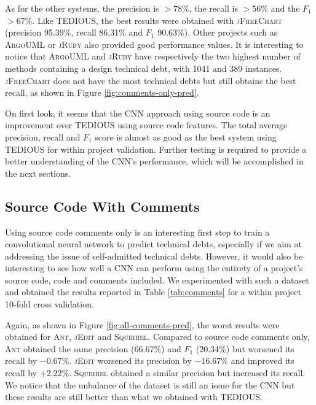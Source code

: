 As for the other systems, the precision is $> 78\%$, the recall is $> 56\%$ and the $F_1$ $> 67\%$. Like TEDIOUS, the best results were obtained with \textsc{jFreeChart} (precision 95.39\%, recall 86.31\% and $F_1$ 90.63\%). Other projects such as \textsc{ArgoUML} or \textsc{jRuby} also provided good performance values. It is interesting to notice that \textsc{ArgoUML} and \textsc{jRuby} have respectively the two highest number of methods containing a design technical debt, with 1041 and 389 instances. \textsc{jFreeChart} does not have the most technical debts but still obtains the best recall, as shown in Figure \ref{fig:comments-only-pred}.

On first look, it seems that the CNN approach using source code is an improvement over TEDIOUS using source code features. The total average precision, recall and $F_1$ score is almost as good as the best system using TEDIOUS for within project validation. Further testing is required to provide a better understanding of the CNN's performance, which will be accomplished in the next sections.



\subsection{Source Code With Comments}


Using source code comments only is an interesting first step to train a convolutional neural network to predict technical debts, especially if we aim at addressing the issue of self-admitted technical debts. However, it would also be interesting to see how well a CNN can perform using the entirety of a project's source code, code and comments included. We experimented with such a dataset and obtained the results reported in Table \ref{tab:comments} for a within project 10-fold cross validation.

Again, as shown in Figure \ref{fig:all-comments-pred}, the worst results were obtained for \textsc{Ant}, \textsc{jEdit} and \textsc{Squirrel}. Compared to source code comments only, \textsc{Ant} obtained the same precision (66.67\%) and $F_1$ (20.34\%) but worsened its recall by $- 0.67\%$. \textsc{jEdit} worsened its precision by $- 16.67\%$ and improved its recall by $+ 2.22\%$. \textsc{Squirrel} obtained a similar precision  but increased its recall. We notice that the unbalance of the dataset is still an issue for the CNN but these results are still better than what we obtained with TEDIOUS.

